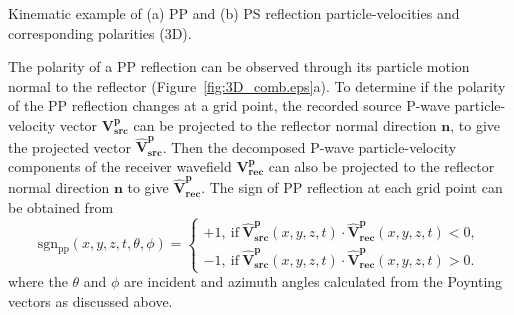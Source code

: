 \documentclass[manuscript,ulem,graphix,revised]{geophysics}
\begin{document}
{
Kinematic example of (a) PP and (b) PS reflection particle-velocities and corresponding polarities (3D). 
}

The polarity of a PP reflection can be observed through its particle motion normal to the reflector (Figure~\ref{fig:3D_comb.eps}a). To determine if the polarity of the PP reflection changes at a grid point, 
the recorded source P-wave particle-velocity vector $\mathbf{V}^{\mathbf{p}}_{\mathbf{src}}$ can be projected to the reflector normal direction $\mathbf{n}$, to give the projected vector $\hat{\mathbf{V}}^{\mathbf{p}}_{\mathbf{src}}$. Then 
the decomposed P-wave particle-velocity components of the receiver wavefield $\mathbf{V}^{\mathbf{p}}_{\mathbf{rec}}$ can also be projected to the reflector normal direction $\mathbf{n}$ to give $\hat{\mathbf{V}}^{\mathbf{p}}_{\mathbf{rec}}$. The sign of PP reflection at each grid point can be obtained from
\begin{equation}
\mathrm{sgn_{pp}}(x,y,z,t,\theta, \phi)=\begin{cases}
 +1, \ \mathrm{if} \  \hat{\mathbf{V}}^{\mathbf{p}}_{\mathbf{src}}(x,y,z,t) \cdot \hat{\mathbf{V}}^{\mathbf{p}}_{\mathbf{rec}}(x,y,z,t)<0 , \\
 -1, \ \mathrm{if}  \ \hat{\mathbf{V}}^{\mathbf{p}}_{\mathbf{src}}(x,y,z,t) \cdot \hat{\mathbf{V}}^{\mathbf{p}}_{\mathbf{rec}}(x,y,z,t)>0 .
\end{cases}
\label{eqn:sgn_pp}
\end{equation}
where the $\theta$ and $\phi$ are incident and azimuth angles calculated from the Poynting vectors as discussed above.
\end{document}
